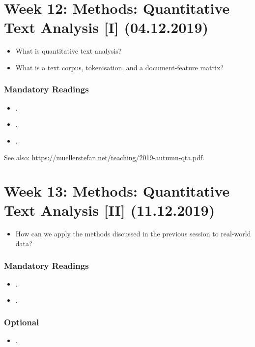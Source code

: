 \documentclass[abstract=on,parskip=full,headings=standardclasses,fontsize=11pt,paper=a4]{scrartcl}
\begin{document}
\section{Week 12: Methods: Quantitative Text Analysis [I] (04.12.2019)}

\begin{itemize}
\renewcommand\labelitemi{--}
\item What is quantitative text analysis?
\item What is a text corpus, tokenisation, and a document-feature matrix?
\end{itemize}

\subsubsection*{Mandatory Readings}
\begin{itemize}
\item {}.
\item {}.
\item {}.
\end{itemize}


See also: \url{https://muellerstefan.net/teaching/2019-autumn-qta.pdf}.

\section{Week 13:  Methods: Quantitative Text Analysis [II] (11.12.2019)}



\begin{itemize}
\renewcommand\labelitemi{--}
\item How can we apply the methods discussed in the previous session to real-world data?
\end{itemize}

\subsubsection*{Mandatory Readings}
\begin{itemize}
\item {}.
\item {}.
\end{itemize}


\subsubsection*{Optional}
\begin{itemize}
\item {}.
\end{itemize}
\end{document}
